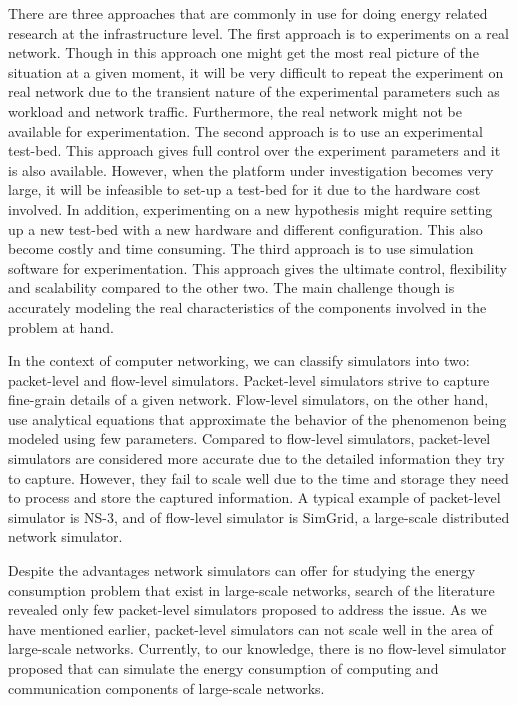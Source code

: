 There are three approaches that are commonly in use for doing energy related research at the infrastructure level. The first approach is to experiments on a real network. Though in this approach one might get the most real picture of the situation at a given moment, it will be very difficult to repeat the experiment on real network due to the transient nature of the experimental parameters such as workload and network traffic.  Furthermore, the real network might not be available for experimentation. The second approach is to use an experimental test-bed. This approach gives full control over the experiment parameters and it is also available. However, when the platform under investigation becomes very large, it will be infeasible to set-up a test-bed for it due to the hardware cost involved. In addition, experimenting on a new hypothesis might require setting up a new test-bed with a new hardware and different configuration. This also become costly and time consuming. The third approach is to use simulation software for experimentation. This approach gives the ultimate control, flexibility and scalability compared to the other two. The main challenge though is accurately modeling the real characteristics of the components involved in the problem at hand.

In the context of computer networking, we can classify simulators into two: packet-level and flow-level simulators. Packet-level simulators strive to capture fine-grain details of a given network. Flow-level simulators, on the other hand, use analytical equations that approximate the behavior of the phenomenon being modeled using few parameters. Compared to flow-level simulators, packet-level simulators are considered more accurate due to the detailed information they try to capture. However, they fail to scale well due to the time and storage they need to process and store the captured information. A typical example of packet-level simulator is NS-3, and of flow-level simulator is SimGrid, a large-scale distributed network simulator. 

Despite the advantages network simulators can offer for studying the energy consumption problem that exist in large-scale networks, search of the literature revealed only few packet-level simulators proposed to address the issue. As we have mentioned earlier, packet-level simulators can not scale well in the area of large-scale networks. Currently, to our knowledge, there is no flow-level simulator proposed that can simulate the energy consumption of computing and communication components of large-scale networks. 


